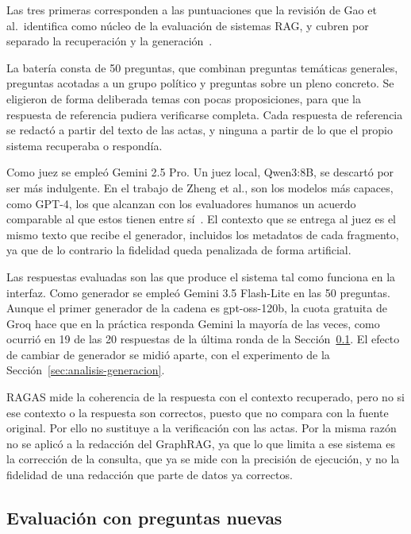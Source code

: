 \documentclass[11pt, a4paper]{report}
\begin{document}
	Las tres primeras corresponden a las puntuaciones que la revisión de Gao et
	al.\ identifica como núcleo de la evaluación de sistemas RAG, y cubren por
	separado la recuperación y la generación~\cite{gao2023-rag-survey}.

	La batería consta de 50 preguntas, que combinan preguntas temáticas generales,
	preguntas acotadas a un grupo político y preguntas sobre un pleno concreto. Se
	eligieron de forma deliberada temas con pocas proposiciones, para que la
	respuesta de referencia pudiera verificarse completa. Cada respuesta de
	referencia se redactó a partir del texto de las actas, y ninguna a partir de
	lo que el propio sistema recuperaba o respondía.

	Como juez se empleó Gemini 2.5 Pro. Un juez local, Qwen3:8B, se descartó por
	ser más indulgente. En el trabajo de Zheng et al., son los
	modelos más capaces, como GPT-4, los que alcanzan con los evaluadores humanos
	un acuerdo comparable al que estos tienen entre sí~\cite{zheng2023-llm-judge}. El contexto que se entrega al juez es el
	mismo texto que recibe el generador, incluidos los metadatos de cada
	fragmento, ya que de lo contrario la fidelidad queda penalizada de forma artificial.

	Las respuestas evaluadas son las que produce el sistema tal como funciona en
	la interfaz. Como generador se empleó Gemini 3.5 Flash-Lite en las 50
	preguntas. Aunque el primer generador de la cadena es gpt-oss-120b, la cuota
	gratuita de Groq hace que en la práctica responda Gemini la mayoría de las
	veces, como ocurrió en 19 de las 20 respuestas de la última ronda de la
	Sección~\ref{sec:metodo-independiente}. El efecto de cambiar de generador se midió aparte, con el
	experimento de la Sección~\ref{sec:analisis-generacion}.

	RAGAS mide la coherencia de la respuesta con el contexto recuperado, pero no
	si ese contexto o la respuesta son correctos, puesto que no compara con la fuente original. Por ello no sustituye a la verificación con las actas. Por la misma
	razón no se aplicó a la redacción del GraphRAG, ya que lo que limita a ese sistema es
	la corrección de la consulta, que ya se mide con la precisión de ejecución, y
	no la fidelidad de una redacción que parte de datos ya correctos.

	\subsection{Evaluación con preguntas nuevas}
	\label{sec:metodo-independiente}
\end{document}

